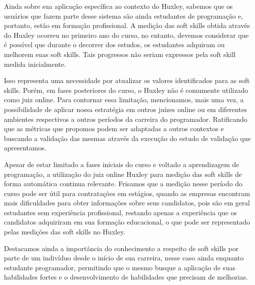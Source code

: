 Ainda sobre sua aplicação específica ao contexto do Huxley, sabemos que os usuários que fazem parte desse sistema são ainda estudantes de programação e, portanto, estão em formação profissional. A medição das soft skills obtida através do Huxley ocorreu no primeiro ano do curso, no entanto, devemos considerar que é possível que durante o decorrer dos estudos, os estudantes adquiram ou melhorem suas soft skills. Tais progressos não seriam expressos pela soft skill medida inicialmente.

Isso representa uma necessidade por atualizar os valores identificados para as soft skills. Porém, em fases posteriores do curso, o Huxley não é comumente utilizado como juiz online. Para contornar essa limitação, mencionamos, mais uma vez, a possibilidade de aplicar nossa estratégia em outros juízes online ou em diferentes ambientes respectivos a outros períodos da carreira do programador. Ratificando que as métricas que propomos podem ser adaptadas a outros contextos e buscando a validação das mesmas através da execução do estudo de validação que apresentamos.

Apesar de estar limitado a fases iniciais do curso e voltado a aprendizagem de programação, a utilização do juiz online Huxley para medição das soft skills de forma automática continua relevante. Frisamos que a medição nesse período do curso pode ser útil para contratações em estágios, quando as empresas encontram mais dificuldades para obter informações sobre seus candidatos, pois são em geral estudantes sem experiência profissional, restando apenas a experiência que os candidatos adquiriram em sua formação educacional, o que pode ser representado pelas medições das soft skills no Huxley.

Destacamos ainda a importância do conhecimento a respeito de soft skills por parte de um indivíduo desde o início de sua carreira, nesse caso ainda enquanto estudante programador, permitindo que o mesmo busque a aplicação de suas habilidades fortes e o desenvolvimento de habilidades que precisam de melhorias. 

